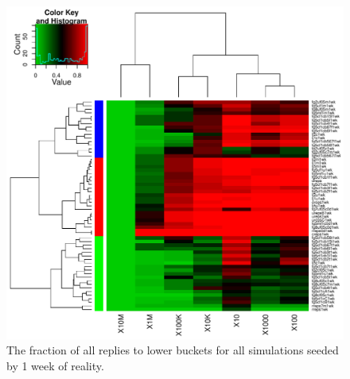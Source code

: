 \documentclass[10pt,oneside]{memoir}
\begin{document}
\begin{Spacing}{2}
\begin{figure}
\begin{center}
    \includegraphics{figures/crop/heatmap-b2br-aftr-rel-medians-1wk}
    \caption{The fraction of all replies to lower buckets for all simulations seeded by 1 week of reality.}
    \label{figure:heatmap-b2br-aftr-rel-medians-1wk}
\end{center}
\end{figure}


\end{Spacing}
\end{document}
